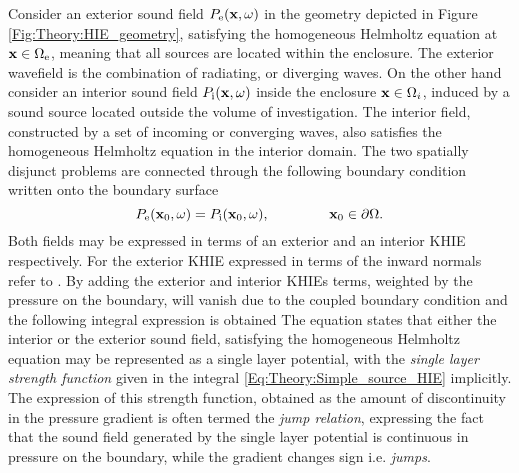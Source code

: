 Consider an exterior sound field $P_{\mathrm{e}}(\mathbf{x},\omega)$ in the geometry depicted in Figure \ref{Fig:Theory:HIE_geometry}, satisfying the homogeneous Helmholtz equation at $\mathbf{x} \in \Omega_{\mathrm{e}}$, meaning that all sources are located within the enclosure. 
The exterior wavefield is the combination of radiating, or diverging waves. 
On the other hand consider an interior sound field $P_{\mathrm{i}}(\mathbf{x},\omega)$ inside the enclosure $\mathbf{x} \in \Omega_i$, induced by a sound source located outside the volume of investigation.
The interior field, constructed by a set of incoming or converging waves, also satisfies the homogeneous Helmholtz equation in the interior domain.
The two spatially disjunct problems are connected through the following boundary condition written onto the boundary surface
\begin{equation}
P_{\mathrm{e}}(\vxo,\omega) = P_{\mathrm{i}}(\vxo,\omega), \hspace{15mm} \vxo \in \dO.
\end{equation}
Both fields may be expressed in terms of an exterior and an interior KHIE respectively.
For the exterior KHIE expressed in terms of the inward normals refer to \cite[eq. 8.30]{Williams1999}.
By adding the exterior and interior KHIEs terms, weighted by the pressure on the boundary, will vanish due to the coupled boundary condition and the following integral expression is obtained \cite{Courant1962, Kellogg1967, Williams1999}
The equation states that either the interior or the exterior sound field, satisfying the homogeneous Helmholtz equation may be represented as a single layer potential, with the \emph{single layer strength function} given in the integral \eqref{Eq:Theory:Simple_source_HIE} implicitly.
The expression of this strength function, obtained as the amount of discontinuity in the pressure gradient is often termed the \emph{jump relation}, expressing the fact that the sound field generated by the single layer potential is continuous in pressure on the boundary, while the gradient changes sign i.e. \emph{jumps}.

